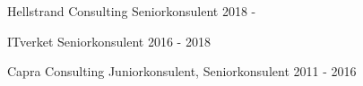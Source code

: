 

\begin{cventries}

    \kunde
    {Hellstrand Consulting} %
    \employer
    {Seniorkonsulent}
    {2018 - }
    {}



    \kunde
    {ITverket} %
    \employer
    {Seniorkonsulent}
    {2016 - 2018}
    {}

    \kunde
    {Capra Consulting} %
    \employer
    {Juniorkonsulent, Seniorkonsulent}
    {2011 - 2016}
    {}
\end{cventries}
